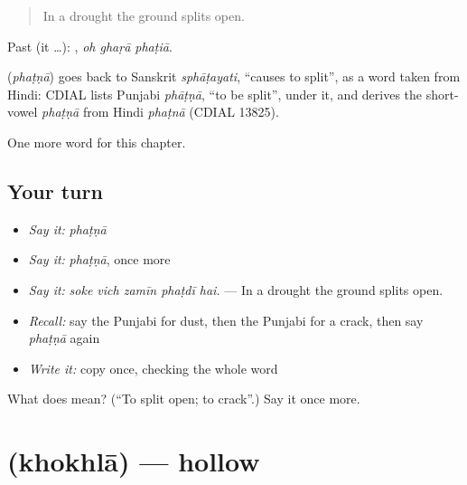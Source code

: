 \begin{quote}
In a drought the ground splits open.
\end{quote}

Past (it …):   , \emph{oh ghaṛā phaṭiā}.

\begin{cousinweb}
\textbf{} (\emph{phaṭṇā}) goes back to Sanskrit \emph{sphāṭayati}, \textquotedblleft{}causes to split\textquotedblright{}, as a word taken from Hindi: CDIAL lists Punjabi \emph{phāṭṇā}, \textquotedblleft{}to be split\textquotedblright{}, under it, and derives the short-vowel \emph{phaṭṇā} from Hindi \emph{phaṭnā} (CDIAL 13825).
\end{cousinweb}

\begin{grammarlens}[title={What you've built}]
One more word for this chapter.
\end{grammarlens}

\subsection*{Your turn}
\begin{itemize}
\raggedright
  \item \emph{Say it:} \emph{phaṭṇā}
  \item \emph{Say it:} \emph{phaṭṇā}, once more
  \item \emph{Say it:} \emph{soke vich zamīn phaṭdī hai.} — In a drought the ground splits open.
  \item \emph{Recall:} say the Punjabi for dust, then the Punjabi for a crack, then say \emph{phaṭṇā} again
  \item \emph{Write it:} copy \textbf{} once, checking the whole word
\end{itemize}

\begin{tcolorbox}[breakable,colback=teal!4,colframe=teal!35!black,title={Before you move on}]
What does  mean? (\textquotedblleft{}To split open; to crack\textquotedblright{}.) Say it once more.
\end{tcolorbox}
\section[\texorpdfstring{\pa{ਖੋਖਲਾ} (khokhlā)}{ਖੋਖਲਾ (khokhlā)}]{ (khokhlā) — hollow}

\label{lesson:PA-C295-khokhla}



